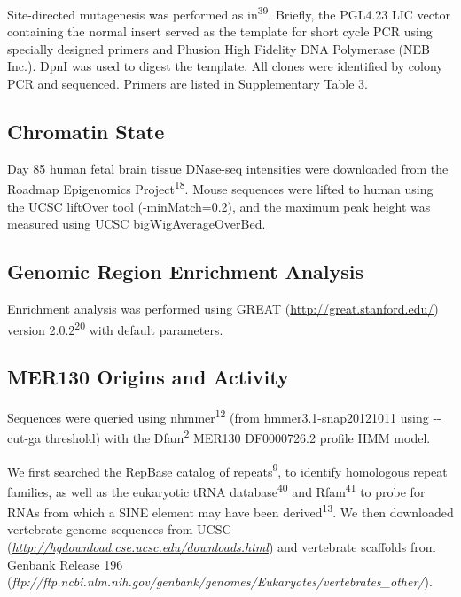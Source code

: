 \documentclass[]{article}
\begin{document}
Site-directed mutagenesis was performed as in\textsuperscript{39}.
Briefly, the PGL4.23 LIC vector containing the normal insert served as
the template for short cycle PCR using specially designed primers and
Phusion High Fidelity DNA Polymerase (NEB Inc.). DpnI was used to digest
the template. All clones were identified by colony PCR and sequenced.
Primers are listed in Supplementary Table 3.

\subsection{Chromatin State}\label{chromatin-state}

Day 85 human fetal brain tissue DNase-seq intensities were downloaded
from the Roadmap Epigenomics Project\textsuperscript{18}. Mouse
sequences were lifted to human using the UCSC liftOver tool
(-minMatch=0.2), and the maximum peak height was measured using UCSC
bigWigAverageOverBed.

\subsection{Genomic Region Enrichment
Analysis}\label{genomic-region-enrichment-analysis}

Enrichment analysis was performed using GREAT
(\url{http://great.stanford.edu/}) version 2.0.2\textsuperscript{20}
with default parameters.

\subsection{\texorpdfstring{MER130 Ori\textbf{g}ins and
Activity}{MER130 Origins and Activity}}\label{mer130-origins-and-activity}

Sequences were queried using nhmmer\textsuperscript{12} (from
hmmer3.1-snap20121011 using -\/-cut-ga threshold) with the
Dfam\textsuperscript{2} MER130 DF0000726.2 profile HMM model.

We first searched the RepBase catalog of repeats\textsuperscript{9}, to
identify homologous repeat families, as well as the eukaryotic tRNA
database\textsuperscript{40} and Rfam\textsuperscript{41} to probe for
RNAs from which a SINE element may have been
derived\textsuperscript{13}. We then downloaded vertebrate genome
sequences from UCSC
(\href{http://hgdownload.cse.ucsc.edu/downloads.html}{\emph{http://hgdownload.cse.ucsc.edu/downloads.html}})
and vertebrate scaffolds from Genbank Release 196
(\emph{ftp://ftp.ncbi.nlm.nih.gov/genbank/genomes/Eukaryotes/vertebrates\_other/}).
\end{document}
